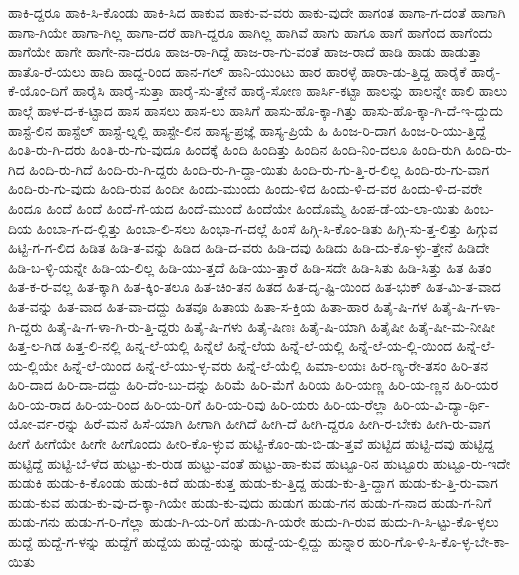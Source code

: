 {ಹಾಕಿ-ದ್ದರೂ
ಹಾಕಿ-ಸಿ-ಕೊಂಡು
ಹಾಕಿ-ಸಿದ
ಹಾಕುವ
ಹಾಕು-ವ-ವರು
ಹಾಕು-ವುದೇ
ಹಾಗಂತ
ಹಾಗಾ-ಗ-ದಂತೆ
ಹಾಗಾಗಿ
ಹಾಗಾ-ಗಿಯೇ
ಹಾಗಾ-ಗಿಲ್ಲ
ಹಾಗಾ-ದರೆ
ಹಾಗಿ-ದ್ದರೂ
ಹಾಗಿಲ್ಲ
ಹಾಗಿವೆ
ಹಾಗು
ಹಾಗೂ
ಹಾಗೆ
ಹಾಗೆಂದ
ಹಾಗೆಂದು
ಹಾಗೆಯೇ
ಹಾಗೇ
ಹಾಗೇ-ನಾ-ದರೂ
ಹಾಜ-ರಾ-ಗಿದ್ದೆ
ಹಾಜ-ರಾ-ಗು-ವಂತೆ
ಹಾಜ-ರಾದೆ
ಹಾಡಿ
ಹಾಡು
ಹಾಡುತ್ತಾ
ಹಾತೊ-ರೆ-ಯಲು
ಹಾದಿ
ಹಾದ್ದ-ರಿಂದ
ಹಾನ-ಗಲ್
ಹಾನಿ-ಯುಂಟು
ಹಾರ
ಹಾರಳ್ಳೆ
ಹಾರಾ-ಡು-ತ್ತಿದ್ದ
ಹಾರೈಕೆ
ಹಾರೈ-ಕೆ-ಯೊಂ-ದಿಗೆ
ಹಾರೈಸಿ
ಹಾರೈ-ಸುತ್ತಾ
ಹಾರೈ-ಸು-ತ್ತೇನೆ
ಹಾರೈ-ಸೋಣ
ಹಾರ್ಸಿ-ಕಟ್ಟಾ
ಹಾಲನ್ನು
ಹಾಲನ್ನೇ
ಹಾಲಿ
ಹಾಲು
ಹಾಲ್ಗೆ
ಹಾಳ-ದ-ಕ-ಟ್ಟಾದ
ಹಾಸ
ಹಾಸಲು
ಹಾಸ-ಲು
ಹಾಸಿಗೆ
ಹಾಸು-ಹೊ-ಕ್ಕಾ-ಗಿತ್ತು
ಹಾಸು-ಹೊ-ಕ್ಕಾ-ಗಿ-ದೆ-ಇ-ದ್ದುದು
ಹಾಸ್ಟೆ-ಲಿನ
ಹಾಸ್ಟೆಲ್
ಹಾಸ್ಟೆ-ಲ್ನಲ್ಲಿ
ಹಾಸ್ಟೇ-ಲಿನ
ಹಾಸ್ಯ-ಪ್ರಜ್ಞೆ
ಹಾಸ್ಯ-ಪ್ರಿಯೆ
ಹಿ
ಹಿಂಜ-ರಿ-ದಾಗ
ಹಿಂಜ-ರಿ-ಯು-ತ್ತಿದ್ದೆ
ಹಿಂತಿ-ರು-ಗಿ-ದರು
ಹಿಂತಿ-ರು-ಗು-ವುದೂ
ಹಿಂದಕ್ಕೆ
ಹಿಂದಿ
ಹಿಂದಿತ್ತು
ಹಿಂದಿನ
ಹಿಂದಿ-ನಿಂ-ದಲೂ
ಹಿಂದಿ-ರುಗಿ
ಹಿಂದಿ-ರು-ಗಿದ
ಹಿಂದಿ-ರು-ಗಿದೆ
ಹಿಂದಿ-ರು-ಗಿ-ದ್ದರು
ಹಿಂದಿ-ರು-ಗಿ-ದ್ದಾ-ಯಿತು
ಹಿಂದಿ-ರು-ಗು-ತ್ತಿ-ರ-ಲಿಲ್ಲ
ಹಿಂದಿ-ರು-ಗು-ವಾಗ
ಹಿಂದಿ-ರು-ಗು-ವುದು
ಹಿಂದಿ-ರುವ
ಹಿಂದೀ
ಹಿಂದು-ಮುಂದು
ಹಿಂದು-ಳಿದ
ಹಿಂದು-ಳಿ-ದ-ವರ
ಹಿಂದು-ಳಿ-ದ-ವರೇ
ಹಿಂದೂ
ಹಿಂದೆ
ಹಿಂದೆ
ಹಿಂದೆ-ಗೆ-ಯದ
ಹಿಂದೆ-ಮುಂದೆ
ಹಿಂದೆಯೇ
ಹಿಂದೊಮ್ಮೆ
ಹಿಂಪ-ಡೆ-ಯ-ಲಾ-ಯಿತು
ಹಿಂಬ-ದಿಯ
ಹಿಂಬಾ-ಗ-ದ-ಲ್ಲಿತ್ತು
ಹಿಂಬಾ-ಲಿ-ಸಲು
ಹಿಂಭಾ-ಗ-ದಲ್ಲೆ
ಹಿಂಸೆ
ಹಿಗ್ಗಿ-ಸಿ-ಕೊಂ-ಡಿತು
ಹಿಗ್ಗಿ-ಸು-ತ್ತ-ಲಿತ್ತು
ಹಿಗ್ಗುವ
ಹಿಟ್ಟಿ-ಗ-ಗ-ಲಿದ
ಹಿಡಿತ
ಹಿಡಿ-ತ-ವನ್ನು
ಹಿಡಿದ
ಹಿಡಿ-ದ-ವರು
ಹಿಡಿ-ದವು
ಹಿಡಿದು
ಹಿಡಿ-ದು-ಕೊ-ಳ್ಳು-ತ್ತೇನೆ
ಹಿಡಿದೇ
ಹಿಡಿ-ಬ-ಳ್ಳಿ-ಯನ್ನೇ
ಹಿಡಿ-ಯ-ಲಿಲ್ಲ
ಹಿಡಿ-ಯು-ತ್ತದೆ
ಹಿಡಿ-ಯು-ತ್ತಾರೆ
ಹಿಡಿ-ಸದೇ
ಹಿಡಿ-ಸಿತು
ಹಿಡಿ-ಸಿತ್ತು
ಹಿತ
ಹಿತಂ
ಹಿತ-ಕ-ರ-ವಲ್ಲ
ಹಿತ-ಕ್ಕಾಗಿ
ಹಿತ-ಕ್ಕಿಂ-ತಲೂ
ಹಿತ-ಚಿಂ-ತನ
ಹಿತದ
ಹಿತ-ದೃ-ಷ್ಟಿ-ಯಿಂದ
ಹಿತ-ಭುಕ್
ಹಿತ-ಮಿ-ತ-ವಾದ
ಹಿತ-ವನ್ನು
ಹಿತ-ವಾದ
ಹಿತ-ವಾ-ದದ್ದು
ಹಿತವೂ
ಹಿತಾಯ
ಹಿತಾ-ಸ-ಕ್ತಿಯ
ಹಿತಾ-ಹಾರ
ಹಿತೈ-ಷಿ-ಗಳ
ಹಿತೈ-ಷಿ-ಗ-ಳಾ-ಗಿ-ದ್ದರು
ಹಿತೈ-ಷಿ-ಗ-ಳಾ-ಗಿ-ರು-ತ್ತಿ-ದ್ದರು
ಹಿತೈ-ಷಿ-ಗಳು
ಹಿತೈ-ಷಿಣಃ
ಹಿತೈ-ಷಿ-ಯಾಗಿ
ಹಿತೈಷೀ
ಹಿತೈ-ಷೀ-ಮ-ನೀಷೀ
ಹಿತ್ತ-ಲ-ಗಿಡ
ಹಿತ್ತ-ಲಿ-ನಲ್ಲಿ
ಹಿನ್ನ-ಲೆ-ಯಲ್ಲಿ
ಹಿನ್ನೆಲೆ
ಹಿನ್ನೆ-ಲೆಯ
ಹಿನ್ನೆ-ಲೆ-ಯಲ್ಲಿ
ಹಿನ್ನೆ-ಲೆ-ಯ-ಲ್ಲಿ-ಯಿಂದ
ಹಿನ್ನೆ-ಲೆ-ಯ-ಲ್ಲಿಯೇ
ಹಿನ್ನೆ-ಲೆ-ಯಿಂದ
ಹಿನ್ನೆ-ಲೆ-ಯು-ಳ್ಳ-ವರು
ಹಿನ್ನೆ-ಲೆ-ಯೆಲ್ಲಿ
ಹಿಮಾ-ಲಯಃ
ಹಿರ-ಣ್ಯ-ರೇ-ತಸಂ
ಹಿರಿ-ತನ
ಹಿರಿ-ದಾದ
ಹಿರಿ-ದಾ-ದದ್ದು
ಹಿರಿ-ದೆಂ-ಬು-ದನ್ನು
ಹಿರಿಮೆ
ಹಿರಿ-ಮೆಗೆ
ಹಿರಿಯ
ಹಿರಿ-ಯಣ್ಣ
ಹಿರಿ-ಯ-ಣ್ಣನ
ಹಿರಿ-ಯರ
ಹಿರಿ-ಯ-ರಾದ
ಹಿರಿ-ಯ-ರಿಂದ
ಹಿರಿ-ಯ-ರಿಗೆ
ಹಿರಿ-ಯ-ರಿವು
ಹಿರಿ-ಯರು
ಹಿರಿ-ಯ-ರೆಲ್ಲಾ
ಹಿರಿ-ಯ-ವಿ-ದ್ಯಾ-ರ್ಥಿ-ಯೋ-ರ್ವ-ರನ್ನು
ಹಿರೆ-ಮನೆ
ಹಿಸೆ-ಯಾಗಿ
ಹೀಗಾಗಿ
ಹೀಗಿದೆ
ಹೀಗಿ-ದೆ
ಹೀಗಿ-ದ್ದರೂ
ಹೀಗಿ-ರ-ಬೇಕು
ಹೀಗಿ-ರು-ವಾಗ
ಹೀಗೆ
ಹೀಗೆಯೇ
ಹೀಗೇ
ಹೀಗೊಂದು
ಹೀರಿ-ಕೊ-ಳ್ಳುವ
ಹುಟ್ಟಿ-ಕೊಂ-ಡು-ಬಿ-ಡು-ತ್ತವೆ
ಹುಟ್ಟಿದ
ಹುಟ್ಟಿ-ದವು
ಹುಟ್ಟಿದ್ದ
ಹುಟ್ಟಿದ್ದೆ
ಹುಟ್ಟಿ-ಬೆ-ಳೆದ
ಹುಟ್ಟು-ಕು-ರುಡ
ಹುಟ್ಟು-ವಂತೆ
ಹುಟ್ಟು-ಹಾ-ಕುವ
ಹುಟ್ಟೂ-ರಿನ
ಹುಟ್ಟೂರು
ಹುಟ್ಟೂ-ರು-ಇದೇ
ಹುಡುಕಿ
ಹುಡು-ಕಿ-ಕೊಂಡು
ಹುಡು-ಕಿದೆ
ಹುಡು-ಕುತ್ತ
ಹುಡು-ಕು-ತ್ತಿದ್ದ
ಹುಡು-ಕು-ತ್ತಿ-ದ್ದಾಗ
ಹುಡು-ಕು-ತ್ತಿ-ರು-ವಾಗ
ಹುಡು-ಕುವ
ಹುಡು-ಕು-ವು-ದ-ಕ್ಕಾ-ಗಿಯೇ
ಹುಡು-ಕು-ವುದು
ಹುಡುಗ
ಹುಡು-ಗನ
ಹುಡು-ಗ-ನಾದ
ಹುಡು-ಗ-ನಿಗೆ
ಹುಡು-ಗನು
ಹುಡು-ಗ-ರಿ-ಗೆಲ್ಲಾ
ಹುಡು-ಗಿ-ಯ-ರಿಗೆ
ಹುಡು-ಗಿ-ಯರೇ
ಹುದು-ಗಿ-ರುವ
ಹುದು-ಗಿ-ಸಿ-ಟ್ಟು-ಕೊ-ಳ್ಳಲು
ಹುದ್ದೆ
ಹುದ್ದೆ-ಗ-ಳನ್ನು
ಹುದ್ದೆಗೆ
ಹುದ್ದೆಯ
ಹುದ್ದೆ-ಯನ್ನು
ಹುದ್ದೆ-ಯ-ಲ್ಲಿದ್ದು
ಹುನ್ನಾರ
ಹುರಿ-ಗೊ-ಳಿ-ಸಿ-ಕೊ-ಳ್ಳ-ಬೇ-ಕಾ-ಯಿತು
}
